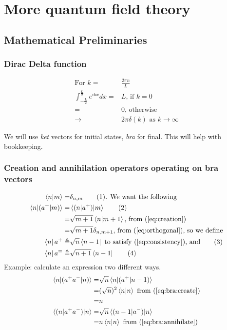\documentclass[]{article}
\newcommand\numberthis{\addtocounter{equation}{1}\tag{\theequation}}
\begin{document}
\section{More quantum field theory}

\subsection{Mathematical Preliminaries}

\subsubsection{Dirac Delta function}

\begin{align*}
\text{For } k =& \frac{2 \pi n}{L}\\
\int_{-\frac{L}{2}}^{\frac{L}{2}} e^{ikx} dx =& L \text{, if $k =0$}\\
=& 0 \text{, otherwise}\\
\rightarrow& 2 \pi \delta(k) \text{ as $k \rightarrow \infty$}
\end{align*}

We will use \emph{ket} vectors for initial states, \emph{bra} for final. This will help with bookkeeping.

\subsubsection{Creation and annihilation operators operating on bra vectors}

\begin{align*}
\braket{n|m} =& \delta_{n,m}\numberthis \label{eq:orthogonal} \text{. We want the following}\\
\braket{n|(a^+|m)} =& \braket{(n|a^+)|m}  \numberthis \label{eq:consistency}\\
=& \sqrt{m+1} \braket{n|m+1} \text{, from (\ref{eq:creation})}\\
=& \sqrt{m+1} \delta_{n,m+1} \text{, from (\ref{eq:orthogonal})} \text{, so we define}\\
\bra{n} a^+ \triangleq & \sqrt{n} \bra{n-1} \text{ to satisfy (\ref{eq:consistency}), and} \numberthis \label{eq:bra:create}\\
\bra{n} a^= \triangleq & \sqrt{n+1} \bra{n-1} \numberthis \label{eq:bra:annihilate}
\end{align*}
Example: calculate an expression two different ways.
\begin{align*}
\braket{n|(a^+a^-|n)} =& \sqrt{n}\braket{n|(a^+|n-1)}\\
=& (\sqrt{n})^2 \braket{n|n} \text{ from (\ref{eq:bra:create})}\\
=& n\\
\braket{(n|a^+a^-)|n} =& \sqrt{n} \braket{(n-1|a^-)|n}\\
=& n \braket{n|n} \text{ from (\ref{eq:bra:annihilate})}
\end{align*}
\end{document}
